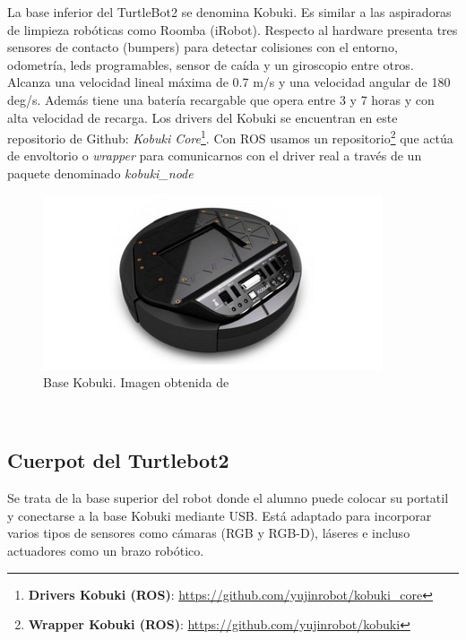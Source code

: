 La base inferior del TurtleBot2 se denomina Kobuki. Es similar a las aspiradoras de limpieza robóticas como Roomba (iRobot). Respecto al hardware presenta tres sensores de contacto (bumpers) para detectar colisiones con el entorno, odometría, leds programables, sensor de caída y un giroscopio entre otros. Alcanza una velocidad lineal máxima de 0.7 m/s y una velocidad angular de 180 deg/s. Además tiene una batería recargable que opera entre 3 y 7 horas y con alta velocidad de recarga. Los drivers del Kobuki se encuentran en este repositorio de Github: \textit{Kobuki Core}\footnote{\textbf{Drivers Kobuki (ROS)}: \url{https://github.com/yujinrobot/kobuki_core}}. Con ROS usamos un repositorio\footnote{\textbf{Wrapper Kobuki (ROS)}: \url{https://github.com/yujinrobot/kobuki}} que actúa de envoltorio o \textit{wrapper} para comunicarnos con el driver real a través de un paquete denominado \textit{kobuki\_node}
\begin{figure} [H]
	\begin{center}
	\includegraphics[width=10cm]{imagenes/cap3/base-kobuki.png}
	\end{center}
	\caption[Base Kobuki]{Base Kobuki. Imagen obtenida de \cite{kobuki}}
	\label{fig:kobuki_real}
\end{figure}\

\subsection{Cuerpot del Turtlebot2}
\label{subsec:turtlebot2_cuerpo}

Se trata de la base superior del robot donde el alumno puede colocar su portatil y conectarse a la base Kobuki mediante USB. Está adaptado para incorporar varios tipos de sensores como cámaras (RGB y RGB-D), láseres e incluso actuadores como un brazo robótico.

